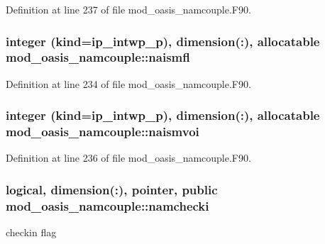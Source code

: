 Definition at line 237 of file mod\+\_\+oasis\+\_\+namcouple.\+F90.

\hypertarget{classmod__oasis__namcouple_a4a7cad8814c7811b364fd7d70b60b576}{
\subsubsection[{naismfl}]{\setlength{\rightskip}{0pt plus 5cm}integer (kind=ip\+\_\+intwp\+\_\+p), dimension(\+:), allocatable mod\+\_\+oasis\+\_\+namcouple\+::naismfl\hspace{0.3cm}{\ttfamily [private]}}}\label{classmod__oasis__namcouple_a4a7cad8814c7811b364fd7d70b60b576}


Definition at line 234 of file mod\+\_\+oasis\+\_\+namcouple.\+F90.

\hypertarget{classmod__oasis__namcouple_ae3d7c72b2f2f3ece9583cc0b25edbaba}{
\subsubsection[{naismvoi}]{\setlength{\rightskip}{0pt plus 5cm}integer (kind=ip\+\_\+intwp\+\_\+p), dimension(\+:), allocatable mod\+\_\+oasis\+\_\+namcouple\+::naismvoi\hspace{0.3cm}{\ttfamily [private]}}}\label{classmod__oasis__namcouple_ae3d7c72b2f2f3ece9583cc0b25edbaba}


Definition at line 236 of file mod\+\_\+oasis\+\_\+namcouple.\+F90.

\hypertarget{classmod__oasis__namcouple_a7c88a329c97aea020e9b135bdca8d160}{
\subsubsection[{namchecki}]{\setlength{\rightskip}{0pt plus 5cm}logical, dimension(\+:), pointer, public mod\+\_\+oasis\+\_\+namcouple\+::namchecki}}\label{classmod__oasis__namcouple_a7c88a329c97aea020e9b135bdca8d160}


checkin flag 



